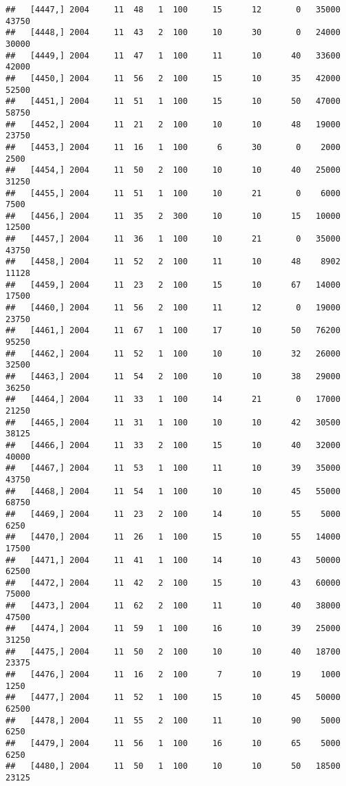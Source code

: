 \documentclass{article}\usepackage[]{graphicx}\usepackage[]{color}
\makeatletter
\newenvironment{kframe}{%
 \def\at@end@of@kframe{}%
 \ifinner\ifhmode%
  \def\at@end@of@kframe{\end{minipage}}%
  \begin{minipage}{\columnwidth}%
 \fi\fi%
 \def\FrameCommand##1{\hskip\@totalleftmargin \hskip-\fboxsep
 \colorbox{shadecolor}{##1}\hskip-\fboxsep
     \hskip-\linewidth \hskip-\@totalleftmargin \hskip\columnwidth}%
 \MakeFramed {\advance\hsize-\width
   \@totalleftmargin\z@ \linewidth\hsize
   \@setminipage}}%
 {\par\unskip\endMakeFramed%
 \at@end@of@kframe}
\newenvironment{knitrout}{}{} %
\makeatother
\begin{document}
\begin{knitrout}
\begin{kframe}
\begin{verbatim}
##   [4447,] 2004     11  48   1  100     15      12       0   35000   43750
##   [4448,] 2004     11  43   2  100     10      30       0   24000   30000
##   [4449,] 2004     11  47   1  100     11      10      40   33600   42000
##   [4450,] 2004     11  56   2  100     15      10      35   42000   52500
##   [4451,] 2004     11  51   1  100     15      10      50   47000   58750
##   [4452,] 2004     11  21   2  100     10      10      48   19000   23750
##   [4453,] 2004     11  16   1  100      6      30       0    2000    2500
##   [4454,] 2004     11  50   2  100     10      10      40   25000   31250
##   [4455,] 2004     11  51   1  100     10      21       0    6000    7500
##   [4456,] 2004     11  35   2  300     10      10      15   10000   12500
##   [4457,] 2004     11  36   1  100     10      21       0   35000   43750
##   [4458,] 2004     11  52   2  100     11      10      48    8902   11128
##   [4459,] 2004     11  23   2  100     15      10      67   14000   17500
##   [4460,] 2004     11  56   2  100     11      12       0   19000   23750
##   [4461,] 2004     11  67   1  100     17      10      50   76200   95250
##   [4462,] 2004     11  52   1  100     10      10      32   26000   32500
##   [4463,] 2004     11  54   2  100     10      10      38   29000   36250
##   [4464,] 2004     11  33   1  100     14      21       0   17000   21250
##   [4465,] 2004     11  31   1  100     10      10      42   30500   38125
##   [4466,] 2004     11  33   2  100     15      10      40   32000   40000
##   [4467,] 2004     11  53   1  100     11      10      39   35000   43750
##   [4468,] 2004     11  54   1  100     10      10      45   55000   68750
##   [4469,] 2004     11  23   2  100     14      10      55    5000    6250
##   [4470,] 2004     11  26   1  100     15      10      55   14000   17500
##   [4471,] 2004     11  41   1  100     14      10      43   50000   62500
##   [4472,] 2004     11  42   2  100     15      10      43   60000   75000
##   [4473,] 2004     11  62   2  100     11      10      40   38000   47500
##   [4474,] 2004     11  59   1  100     16      10      39   25000   31250
##   [4475,] 2004     11  50   2  100     10      10      40   18700   23375
##   [4476,] 2004     11  16   2  100      7      10      19    1000    1250
##   [4477,] 2004     11  52   1  100     15      10      45   50000   62500
##   [4478,] 2004     11  55   2  100     11      10      90    5000    6250
##   [4479,] 2004     11  56   1  100     16      10      65    5000    6250
##   [4480,] 2004     11  50   1  100     10      10      50   18500   23125

\end{verbatim}
\end{kframe}
\end{knitrout}
\end{document}
